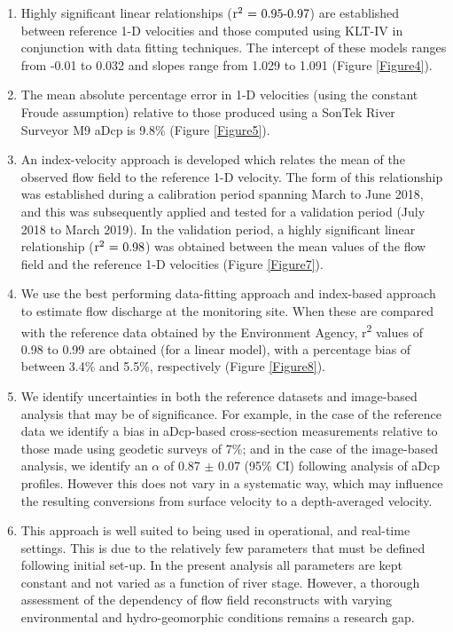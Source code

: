 \documentclass[hess, manuscript]{copernicus}
\begin{document}
\begin{enumerate}
    \item Highly significant linear relationships (${\textnormal{r\textsuperscript{2} = 0.95-0.97}}$) are established between reference 1-D velocities and those computed using KLT-IV in conjunction with data fitting techniques. The intercept of these models ranges from -0.01 to 0.032 and slopes range from 1.029 to 1.091 (Figure \ref{Figure4}). 
    \item The mean absolute percentage error in 1-D velocities (using the constant Froude assumption) relative to those produced using a SonTek River Surveyor M9 aDcp is 9.8\% (Figure \ref{Figure5}).    
    \item An index-velocity approach is developed which relates the mean of the observed flow field to the reference 1-D velocity. The form of this relationship was established during a calibration period spanning March to June 2018, and this was subsequently applied and tested for a validation period (July 2018 to March 2019). In the validation period, a highly significant linear relationship (${\textnormal{r\textsuperscript{2} = 0.98}}$) was obtained between the mean values of the flow field and the reference 1-D velocities (Figure \ref{Figure7}).
    \item We use the best performing data-fitting approach and index-based approach to estimate flow discharge at the monitoring site. When these are compared with the reference data obtained by the Environment Agency, r\textsuperscript{2} values of 0.98 to 0.99 are obtained (for a linear model), with a percentage bias of between 3.4\% and 5.5\%, respectively (Figure \ref{Figure8}).
    \item We identify uncertainties in both the reference datasets and image-based analysis that may be of significance. For example, in the case of the reference data we identify a bias in aDcp-based cross-section measurements relative to those made using geodetic surveys of 7\%; and in the case of the image-based analysis, we identify an $\alpha$ of 0.87 $\pm$ 0.07 (95\% CI) following analysis of aDcp profiles. However this does not vary in a systematic way, which may influence the resulting conversions from surface velocity to a depth-averaged velocity. 
    \item This approach is well suited to being used in operational, and real-time settings. This is due to the relatively few parameters that must be defined following initial set-up. In the present analysis all parameters are kept constant and not varied as a function of river stage. However, a thorough assessment of the dependency of flow field reconstructs with varying environmental and hydro-geomorphic conditions remains a research gap. 
\end{enumerate}
\end{document}
